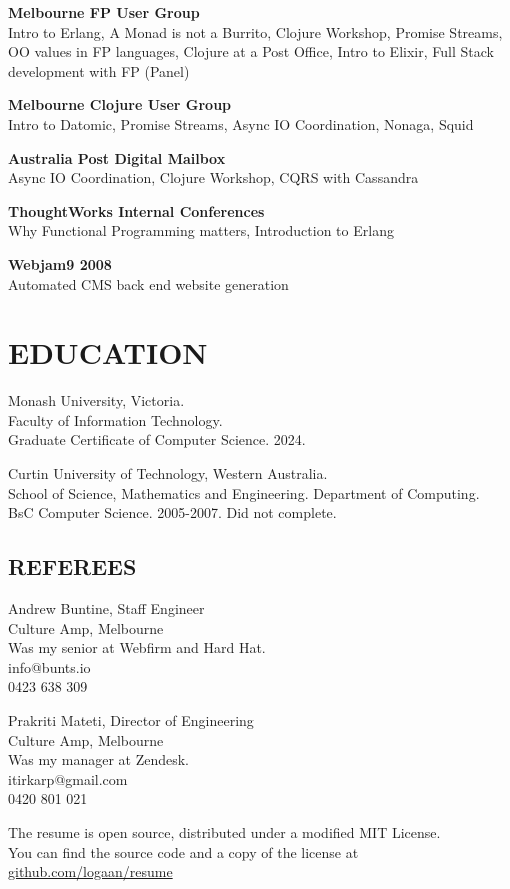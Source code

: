 \documentclass[margin]{res}
\begin{document}
\begin{resume}
\begin{multicols}{2}
    \textbf{Melbourne FP User Group} \\
    Intro to Erlang, A Monad is not a Burrito, Clojure Workshop, Promise
    Streams, OO values in FP languages, Clojure at a Post Office, Intro to
    Elixir, Full Stack development with FP (Panel)

    \textbf{Melbourne Clojure User Group} \\
    Intro to Datomic, Promise Streams, Async IO Coordination, Nonaga, Squid

    \columnbreak

    \textbf{Australia Post Digital Mailbox} \\
    Async IO Coordination, Clojure Workshop, CQRS with Cassandra

    \textbf{ThoughtWorks Internal Conferences} \\
    Why Functional Programming matters, Introduction to Erlang

    \textbf{Webjam9 2008} \\
    Automated CMS back end website generation
  \end{multicols}

  \section{EDUCATION}
  Monash University, Victoria. \\
  Faculty of Information Technology. \\
  Graduate Certificate of Computer Science. 2024.
  
  Curtin University of Technology, Western Australia. \\
  School of Science, Mathematics and
  Engineering. Department of Computing. \\
  BsC Computer Science. 2005-2007. Did not complete.

  \begin{multicols}{2}
    \section{REFEREES}
    Andrew Buntine, Staff Engineer \\
    Culture Amp, Melbourne \\
    Was my senior at Webfirm and Hard Hat. \\
    info@bunts.io \\
    0423 638 309

	Prakriti Mateti, Director of Engineering \\
	Culture Amp, Melbourne \\
	Was my manager at Zendesk. \\
	itirkarp@gmail.com \\
	0420 801 021
  \end{multicols}

\end{resume} 

\centering
\hspace{-1.75in} The resume is open source, distributed under a modified MIT
License. \\
\hspace{-1.75in} You can find the source code and a copy of the license at
\href{http://github.com/logaan/resume}{github.com/logaan/resume}
\end{document}
